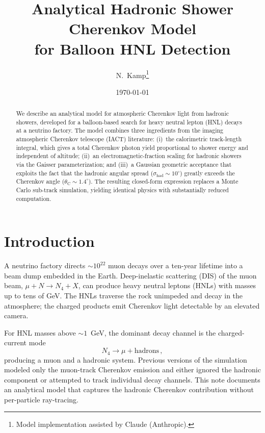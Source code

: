 \documentclass[11pt]{article}
\title{Analytical Hadronic Shower Cherenkov Model\\
for Balloon HNL Detection}
\author{N.\ Kamp\thanks{Model implementation assisted by Claude (Anthropic).}}
\date{\today}
\newcommand{\shad}{\sigma_{\mathrm{had}}}
\newcommand{\thetaC}{\theta_{\mathrm{C}}}
\begin{document}
\maketitle

\begin{abstract}
We describe an analytical model for atmospheric Cherenkov light from
hadronic showers, developed for a balloon-based search for heavy neutral
lepton (HNL) decays at a neutrino factory.  The model combines three
ingredients from the imaging atmospheric Cherenkov telescope (IACT)
literature: (i)~the calorimetric track-length integral, which gives a
total Cherenkov photon yield proportional to shower energy and
independent of altitude; (ii)~an electromagnetic-fraction scaling for
hadronic showers via the Gaisser parameterization; and (iii)~a Gaussian
geometric acceptance that exploits the fact that the hadronic angular
spread ($\shad \sim 10^\circ$) greatly exceeds the Cherenkov angle
($\thetaC \sim 1.4^\circ$).  The resulting closed-form expression
replaces a Monte Carlo sub-track simulation, yielding identical physics
with substantially reduced computation.
\end{abstract}

\tableofcontents

\section{Introduction}
\label{sec:intro}

A neutrino factory directs $\sim 10^{22}$ muon decays over a ten-year
lifetime into a beam dump embedded in the Earth.  Deep-inelastic
scattering (DIS) of the muon beam, $\mu + N \to N_4 + X$, can produce
heavy neutral leptons (HNLs) with masses up to tens of GeV.  The HNLs
traverse the rock unimpeded and decay in the atmosphere; the charged
products emit Cherenkov light detectable by an elevated camera.

For HNL masses above $\sim 1$~GeV, the dominant decay channel is the
charged-current mode
\begin{equation}
  N_4 \to \mu + \text{hadrons}\,,
  \label{eq:hnl_decay}
\end{equation}
producing a muon and a hadronic system.  Previous versions of the
simulation modeled only the muon-track Cherenkov emission and either
ignored the hadronic component or attempted to track individual decay
channels.  This note documents an analytical model that captures the
hadronic Cherenkov contribution without per-particle ray-tracing.
\end{document}
